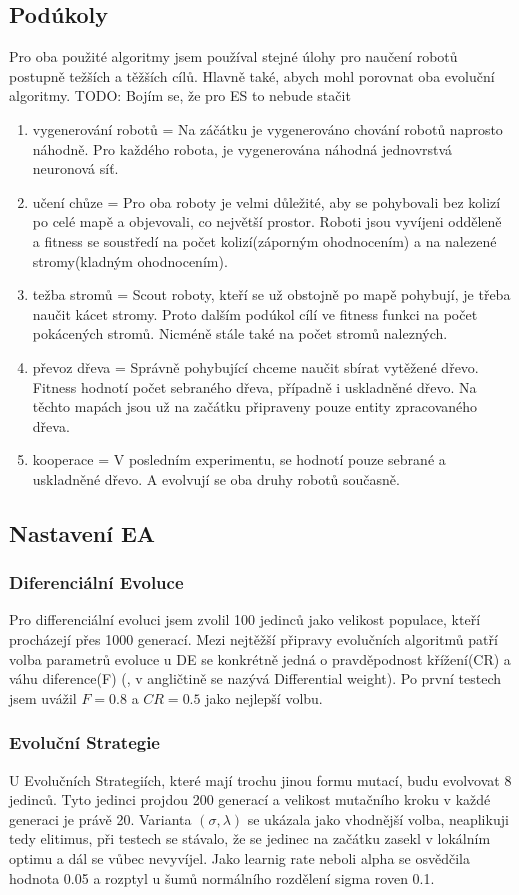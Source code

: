 \subsection{Podúkoly} 
Pro oba použité algoritmy jsem používal stejné úlohy pro naučení robotů postupně težších a těžších cílů. Hlavně také, abych mohl porovnat oba evoluční algoritmy. TODO: Bojím se, že pro ES to nebude stačit 
\begin{enumerate}
        \item vygenerování robotů = Na záčátku je vygenerováno chování robotů naprosto náhodně. Pro každého robota, je vygenerována náhodná jednovrstvá neuronová síť. 
        \item učení chůze = Pro oba roboty je velmi důležité, aby se pohybovali bez kolizí po celé mapě a objevovali, co největší prostor. Roboti jsou vyvíjeni odděleně a fitness se soustředí na počet kolizí(záporným ohodnocením) a na nalezené stromy(kladným ohodnocením).
        \item težba stromů = Scout roboty, kteří se už obstojně po mapě pohybují, je třeba naučit kácet stromy. Proto dalším podúkol cílí ve fitness funkci na počet pokácených stromů. Nicméně stále také na počet stromů nalezných. 
        \item převoz dřeva = Správně pohybující chceme naučit sbírat vytěžené dřevo. Fitness hodnotí počet sebraného dřeva, případně i uskladněné dřevo. Na těchto mapách jsou už na začátku připraveny pouze entity zpracovaného dřeva.
        \item kooperace = V posledním experimentu, se hodnotí pouze sebrané a uskladněné dřevo. A evolvují se oba druhy robotů současně. 
\end{enumerate}

\subsection{Nastavení EA}
\subsubsection{Diferenciální Evoluce}
Pro differenciální evoluci jsem zvolil 100 jedinců jako velikost populace, kteří procházejí přes 1000 generací. Mezi nejtěžší připravy evolučních algoritmů patří volba parametrů evoluce u DE se konkrétně jedná o pravděpodnost křížení(CR) a váhu diference(F) (, v angličtině se nazývá Differential weight). Po první testech jsem uvážil $F = 0.8 $ a $CR = 0.5$ jako nejlepší volbu. 
\subsubsection{Evoluční Strategie}
U Evolučních Strategiích, které mají trochu jinou formu mutací, budu evolvovat 8 jedinců. Tyto jedinci projdou 200 generací a velikost mutačního kroku  v každé generaci je právě 20. Varianta $(\sigma,\lambda)$ se ukázala jako vhodnější volba, neaplikuji tedy elitimus, při testech se stávalo, že se jedinec na začátku zasekl v lokálním optimu a dál se vůbec nevyvíjel. Jako learnig rate neboli alpha se osvědčila hodnota 0.05 a rozptyl u šumů normálního rozdělení sigma roven 0.1.
